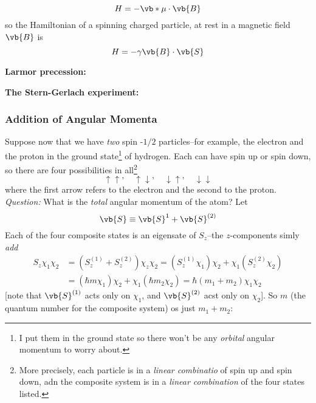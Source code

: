 \begin{equation}\label{4.157}
	H =-\vb*{\mu}\cdot\vb{B}
\end{equation}
so the Hamiltonian of a spinning charged particle, at rest in a magnetic field $\vb{B}$ is
\begin{equation}\label{4.158}
	H = -\gamma\vb{B}\cdot\vb{S}
\end{equation}

\begin{example}
	\textbf{Larmor precession:}
\end{example}

\begin{example}
	\textbf{The Stern-Gerlach experiment:}
\end{example}

\subsubsection{Addition of Angular Momenta}\label{sec:4.4.3}
Suppose now that we have \textit{two} spin -$1/2$ particles--for example, the electron and the proton in the ground state\footnote{I put them in the ground state so there won't be any \textit{orbital} angular momentum to worry about.} of hydrogen. Each can have spin up or spin down, so there are four possibilities in all\footnote{More precisely, each particle is in a \textit{linear combinatio} of spin up and spin down, adn the composite system is in a \textit{linear combination} of the four states listed.}
\begin{equation}\label{4.175}
	\uparrow\uparrow,\quad \uparrow\downarrow,\quad \downarrow\uparrow, \quad \downarrow\downarrow
\end{equation}
where the first arrow refers to the electron and the second to the proton. \textit{Question:} What is the \textit{total} angular momentum of the atom? Let
\begin{equation}\label{4.176}
	\vb{S}\equiv \vb{S}^{1}+\vb{S}^{(2)}
\end{equation}
Each of the four composite states is an eigensate of $S_z$--the $z$-components simly \textit{add}
\begin{align*}
	S_z\chi_1\chi_2&=(S_z^{(1)} + S_z^{(2)})\chi_z\chi_2=(S_z^{(1)}\chi_1)\chi_2+\chi_1(S_z^{(2)}\chi_2)\\
								 &=(\hbar m\chi_1)\chi_2+\chi_1(\hbar m_2\chi_2) = \hbar(m_1+m_2)\chi_1\chi_2
\end{align*}
[note that $\vb{S}^{(1)} $ acts only on $\chi_1$, and $\vb{S}^{(2)}$ acst only on $\chi_2$]. So $m$ (the quantum number for the composite system) os just $m_1+m_2$:
